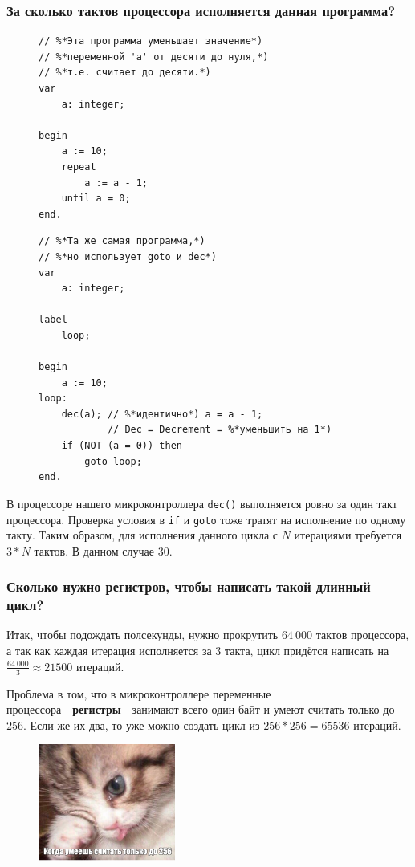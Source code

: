 \documentclass[aspectratio=169, pdf, 8pt, unicode]{beamer}
\begin{document}
\begin{frame}[fragile]
\frametitle{За сколько тактов процессора исполняется данная программа?}
	\begin{figure}[!htb]
		\centering
		\begin{minipage}{.40\textwidth}
			\begin{lstlisting}
// %*Эта программа уменьшает значение*)
// %*переменной 'a' от десяти до нуля,*)
// %*т.е. считает до десяти.*)
var
    a: integer;

begin
    a := 10;
    repeat
        a := a - 1;
    until a = 0;
end.

			\end{lstlisting}
		\end{minipage}
		\begin{minipage}{.55\textwidth}
			\begin{lstlisting}
// %*Та же самая программа,*)
// %*но использует goto и dec*)
var
    a: integer;

label
    loop;

begin
    a := 10;
loop:
    dec(a); // %*идентично*) a = a - 1;
            // Dec = Decrement = %*уменьшить на 1*)
    if (NOT (a = 0)) then
        goto loop;
end.
			\end{lstlisting}
		\end{minipage}
	\end{figure}
		В процессоре нашего микроконтроллера \texttt{dec()} выполняется ровно за один такт процессора.
		Проверка условия в \texttt{if} и \texttt{goto} тоже тратят на исполнение по одному такту. Таким образом, для
		исполнения данного цикла с $N$ итерациями требуется $3*N$ тактов. В данном случае 30.
\end{frame}

\begin{frame}[fragile]
\frametitle{Сколько нужно регистров, чтобы написать такой длинный цикл?}
	{ \large
		Итак, чтобы подождать полсекунды, нужно прокрутить $64\ 000$ тактов процессора, а так как каждая итерация
		исполняется за $3$ такта, цикл придётся написать на $\frac{64\ 000}{3} \approx 21500$ итераций.

		Проблема в том, что в микроконтроллере переменные процессора\ \cyrdash\ \textbf{регистры}\ \cyrdash\ занимают
		всего один байт и умеют считать только до $256$. Если же их два, то уже можно создать цикл из $256*256=65536$
		итераций.
		\begin{figure}[H]
		      \centering
		      \includegraphics[width=0.4\textwidth]{resources/sad_kitty_rus.png}
		\end{figure}
	}
\end{frame}
\end{document}
